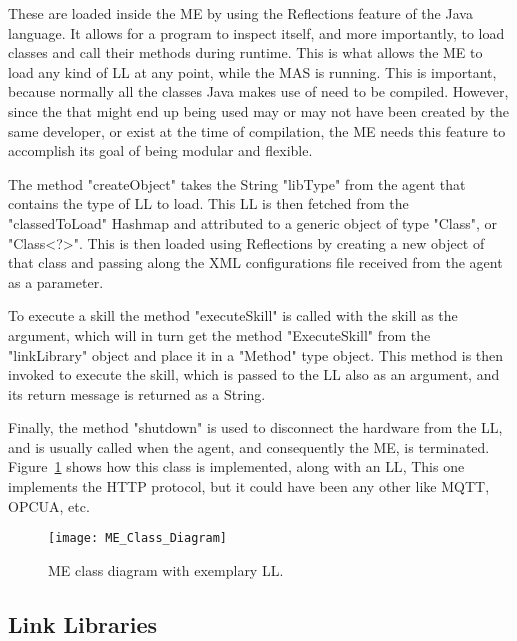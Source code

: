 These  are loaded inside the \acrshort{ME} by using the Reflections feature of the Java language. It allows for a program to inspect itself, and more importantly, to load classes and call their methods during runtime. This is what allows the \acrshort{ME} to load any kind of \acrshort{LL} at any point, while the \acrshort{MAS} is running. This is important, because normally all the classes Java makes use of need to be compiled. However, since the  that might end up being used may or may not have been created by the same developer, or exist at the time of compilation, the \acrshort{ME} needs this feature to accomplish its goal of being modular and flexible.

The method "createObject" takes the String "libType" from the agent that contains the type of \acrshort{LL} to load. This \acrshort{LL} is then fetched from the "classedToLoad" Hashmap and attributed to a generic object of type "Class", or "Class<?>". This is then loaded using Reflections by creating a new object of that class and passing along the \acrshort{XML} configurations file received from the agent as a parameter.

To execute a skill the method "executeSkill" is called with the skill as the argument, which will in turn get the method "ExecuteSkill" from the "linkLibrary" object and place it in a "Method" type object. This method is then invoked to execute the skill, which is passed to the \acrshort{LL} also as an argument, and its return message is returned as a String.

Finally, the method "shutdown" is used to disconnect the hardware from the \acrlong{LL}, and is usually called when the agent, and consequently the \acrshort{ME}, is terminated. Figure~\ref{fig:module_engine_class_diagram} shows how this class is implemented, along with an \acrshort{LL}, This one implements the \acrshort{HTTP} protocol, but it could have been any other like \acrshort{MQTT}, \acrshort{OPCUA}, etc.\\

\begin{figure}[h!]
	\centering
	\texttt{[image: ME\_Class\_Diagram]}
	\caption{\acrlong{ME} class diagram with exemplary \acrlong{LL}.}
	\label{fig:module_engine_class_diagram}
\end{figure}

\subsection{Link Libraries}
\label{subsec:link_library_class}

